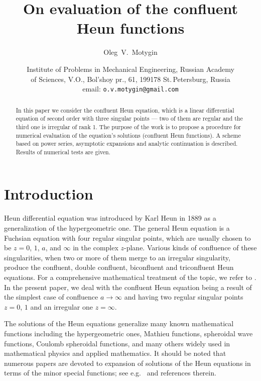 \documentclass[11pt]{article}
\begin{document}
\title{On evaluation of the confluent Heun functions}

\author{Oleg\ V.\ Motygin}
 
\date{Institute of Problems in Mechanical Engineering, Russian Academy\\ of
Sciences,
 V.O., Bol'shoy pr., 61, 199178 St.\,Petersburg, Russia\\ 
email: \texttt{o.v.motygin@gmail.com}}

\maketitle

\begin{abstract}

In this paper we consider the confluent Heun equation, which is a linear differential equation of second order with three singular points --- two of them are regular and the third one is irregular of rank 1. The purpose of the work is to propose a procedure for numerical evaluation of the equation's solutions (confluent Heun functions). A scheme based on power series, asymptotic expansions and analytic continuation is described. Results of numerical tests are given.

\end{abstract}

\section{Introduction}
\label{intro0}

Heun differential equation was introduced by Karl Heun in 1889 \cite{Heun} as a generalization of the hypergeometric one. The general Heun equation is a Fuchsian equation with four regular singular points, which are usually chosen to be $z = 0$, $1$, $a$, and $\infty$ in the complex $z$-plane.
Various kinds of confluence of these singularities, when two or more of them merge to an irregular singularity, produce the confluent, double confluent, biconfluent and triconfluent Heun equations. For a comprehensive mathematical treatment of the topic, we refer to \cite{Ronveaux1995,SlavyanovLay2000,SleemanKuznetzov2010}. In the present paper, we deal with the confluent Heun equation being a result of the simplest case of confluence $a\to\infty$ and having two regular singular points $z=0$, $1$ and an irregular one $z=\infty$.  

The solutions of the Heun equations generalize many known mathematical functions including the hypergeometric ones, Mathieu functions, spheroidal wave functions, Coulomb spheroidal functions, and many others widely used in mathematical physics and applied mathematics.
It should be noted that numerous papers are devoted to expansion of solutions of the Heun equations in terms of the minor special functions; see e.g.\ \cite{El-JaickFigueiredo2013,Ishkhanyan2014,LeroyIshkhanyan2015} and references therein. 
\end{document}

